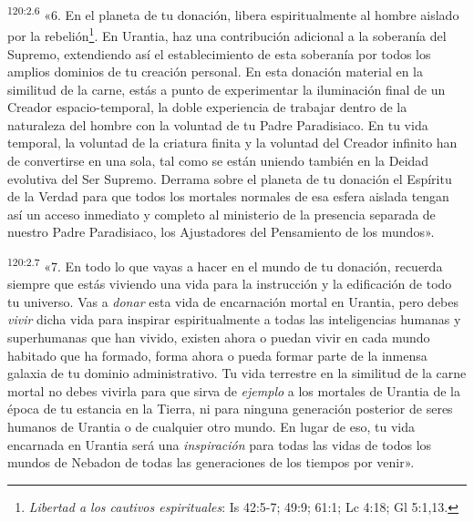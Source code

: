 \par
\textsuperscript{120:2.6} «6. En el planeta de tu donación, libera espiritualmente al hombre aislado por la rebelión\footnote{\textit{Libertad a los cautivos espirituales}: Is 42:5-7; 49:9; 61:1; Lc 4:18; Gl 5:1,13.}. En Urantia, haz una contribución adicional a la soberanía del Supremo, extendiendo así el establecimiento de esta soberanía por todos los amplios dominios de tu creación personal. En esta donación material en la similitud de la carne, estás a punto de experimentar la iluminación final de un Creador espacio-temporal, la doble experiencia de trabajar dentro de la naturaleza del hombre con la voluntad de tu Padre Paradisiaco. En tu vida temporal, la voluntad de la criatura finita y la voluntad del Creador infinito han de convertirse en una sola, tal como se están uniendo también en la Deidad evolutiva del Ser Supremo. Derrama sobre el planeta de tu donación el Espíritu de la Verdad para que todos los mortales normales de esa esfera aislada tengan así un acceso inmediato y completo al ministerio de la presencia separada de nuestro Padre Paradisiaco, los Ajustadores del Pensamiento de los mundos».

\par
\textsuperscript{120:2.7} «7. En todo lo que vayas a hacer en el mundo de tu donación, recuerda siempre que estás viviendo una vida para la instrucción y la edificación de todo tu universo. Vas a \textit{donar} esta vida de encarnación mortal en Urantia, pero debes \textit{vivir} dicha vida para inspirar espiritualmente a todas las inteligencias humanas y superhumanas que han vivido, existen ahora o puedan vivir en cada mundo habitado que ha formado, forma ahora o pueda formar parte de la inmensa galaxia de tu dominio administrativo. Tu vida terrestre en la similitud de la carne mortal no debes vivirla para que sirva de \textit{ejemplo} a los mortales de Urantia de la época de tu estancia en la Tierra, ni para ninguna generación posterior de seres humanos de Urantia o de cualquier otro mundo. En lugar de eso, tu vida encarnada en Urantia será una \textit{inspiración} para todas las vidas de todos los mundos de Nebadon de todas las generaciones de los tiempos por venir».

